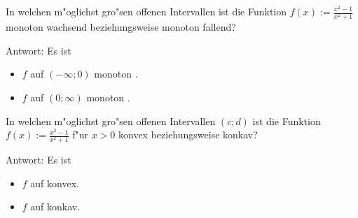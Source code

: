 \begin{MExercises}

\begin{MExercise}
In welchen m"oglichst gro"sen offenen Intervallen ist die Funktion
$f(x) := \frac{x^2 - 1}{x^2 + 1}$
monoton wachsend beziehungsweise monoton fallend?

Antwort: Es ist
\begin{itemize}
\item $f$ auf $(-\infty;0)$ monoton .
%
\item $f$ auf $(0; \infty)$ monoton .
\end{itemize}
\end{MExercise}


\begin{MExercise}
In welchen m"oglichst gro"sen offenen Intervallen $(c; d)$ ist die Funktion
$f(x) := \frac{x^2 - 1}{x^2 + 1}$ f"ur $x > 0$
konvex beziehungsweise konkav?

Antwort: Es ist
\begin{itemize}
\item $f$ auf  konvex.
%
\item $f$ auf  konkav.
\end{itemize}
\end{MExercise}



\end{MExercises}
